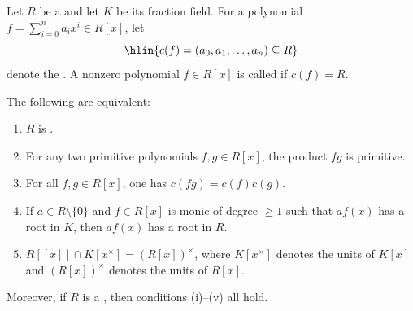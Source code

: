 \begin{theorem} \label{theorem:gauss_lemma_for_integrally_closed_domain_primitive_poly_product_content_ideal_multiplicativity}
Let $R$ be a  and let $K$ be its fraction field. For a polynomial $f = \sum_{i=0}^n a_i x^i \in R[x]$, let
$$\hlin{c(f) = (a_0, a_1, \dots, a_n) \subseteq R}$$
denote the . A nonzero polynomial $f \in R[x]$ is called  if $c(f) = R$.

The following are equivalent:
\begin{enumerate}
    \item[(i)] $R$ is .
    \item[(ii)] For any two primitive polynomials $f, g \in R[x]$, the product $fg$ is primitive.
    \item[(iii)] For all $f, g \in R[x]$, one has $c(fg) = c(f)c(g)$.
    \item[(iv)] If $a \in R \setminus \{0\}$ and $f \in R[x]$ is monic of degree $\ge 1$ such that $a f(x)$ has a root in $K$, then $a f(x)$ has a root in $R$.
    \item[(v)] $R[[x]] \cap K[x^\times] = (R[x])^\times$, where $K[x^\times]$ denotes the units of $K[x]$ and $(R[x])^\times$ denotes the units of $R[x]$.
\end{enumerate}
Moreover, if $R$ is a , then conditions (i)--(v) all hold.
\end{theorem}

